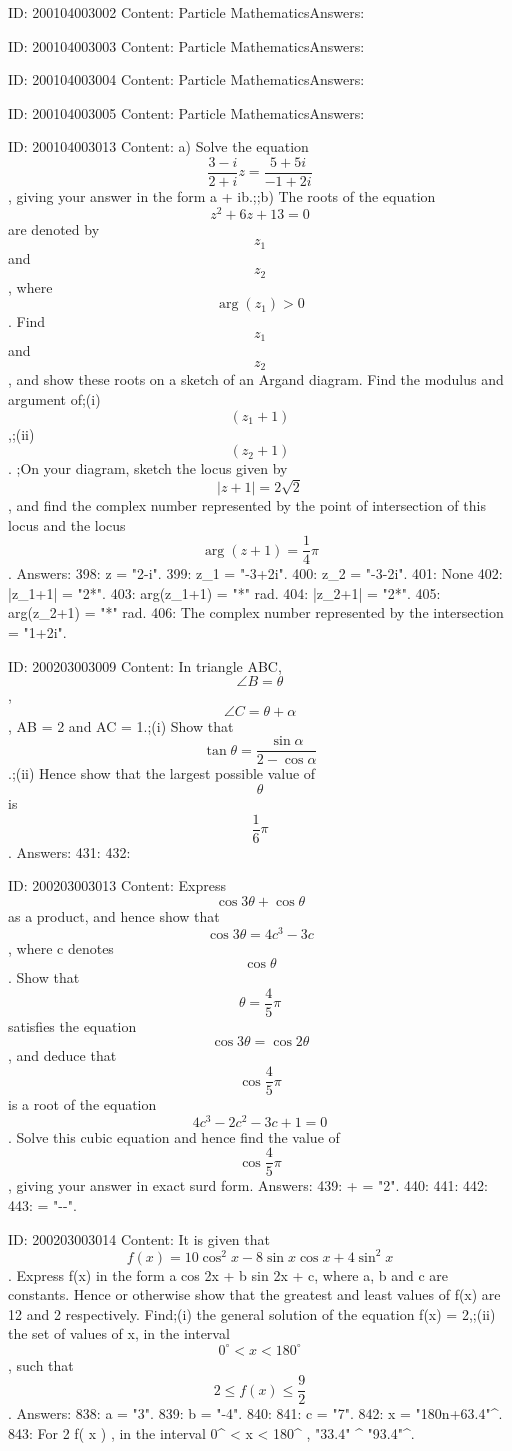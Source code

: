 \documentclass{article}
\begin{document}
ID: 200104003002
Content:
Particle MathematicsAnswers:

ID: 200104003003
Content:
Particle MathematicsAnswers:

ID: 200104003004
Content:
Particle MathematicsAnswers:

ID: 200104003005
Content:
Particle MathematicsAnswers:

ID: 200104003013
Content:
a)  Solve the equation  $$\frac{3 - i}{2 + i}z = \frac{5 + 5i}{- 1 + 2i}$$, giving your answer in the form a + ib.;;b) The roots of the equation  $$z^2  + 6z + 13 = 0$$ are denoted by  $$z_1 $$ and  $$z_2 $$, where  $$\arg ( z_1  ) > 0$$. Find  $$z_1 $$ and  $$z_2 $$, and show these roots on a sketch of an Argand diagram. Find the modulus and argument of;(i)  $$( z_1  + 1 )$$,;(ii)  $$( z_2  + 1 )$$. ;On your diagram, sketch the locus given by  $$| z + 1 | = 2\sqrt 2 $$, and find the complex number represented by the point of intersection of this locus and the locus  $$\arg ( z + 1 ) = \frac{1}{4}\pi $$. Answers:
398: z = "2-i".
399: z_1 = "-3+2i".
400: z_2 = "-3-2i".
401: None
402: |z_1+1| = "2*".
403: arg(z_1+1) = "*\pi" rad.
404: |z_2+1| = "2*".
405: arg(z_2+1) = "*\pi" rad.
406: The complex number represented by the intersection = "1+2i".

ID: 200203003009
Content:
In triangle ABC,  $$\angle B = \theta $$,  $$\angle C = \theta  + \alpha $$, AB = 2 and AC = 1.;(i) Show that  $$\tan \theta  = \frac{\sin \alpha}{2 - \cos \alpha}$$.;(ii) Hence show that the largest possible value of  $$\theta $$ is  $$\frac{1}{6}\pi $$. Answers:
431: 
432: 

ID: 200203003013
Content:
Express  $$\cos 3\theta  + \cos \theta $$ as a product, and hence show that  $$\cos 3\theta  = 4c^3  - 3c$$, where c denotes  $$\cos \theta $$. Show that  $$\theta  = \frac{4}{5}\pi $$ satisfies the equation  $$\cos 3\theta  = \cos 2\theta $$, and deduce that  $$\cos \frac{4}{5}\pi $$ is a root of the equation  $$4c^3  - 2c^2  - 3c + 1 = 0$$. Solve this cubic equation and hence find the value of  $$\cos \frac{4}{5}\pi$$, giving your answer in exact surd form. Answers:
439: \theta  + \cos \theta  = "2\cos{2\theta}\cos{\theta}".
440: 
441: 
442: 
443: \cos {}\pi = "--".

ID: 200203003014
Content:
It is given that  $$f( x ) = 10\cos ^2 x - 8\sin x\cos x + 4\sin ^2 x$$. Express f(x) in the form a cos 2x + b sin 2x + c, where a, b and c are constants. Hence or otherwise show that the greatest and least values of f(x) are 12 and 2 respectively. Find;(i) the general solution of the equation f(x) = 2,;(ii) the set of values of x, in the interval  $$0^{\circ}  < x < 180^{\circ} $$, such that  $$2 \le f( x ) \le \frac{9}{2}$$. Answers:
838: a = "3".
839: b = "-4".
840: 
841: c = "7".
842: x = "180n+63.4"^{\circ}.
843: For 2 \le f( x ) \le {}, in the interval 0^{\circ}  < x < 180^{\circ} , "33.4" ^{\circ} \leqx\leq"93.4"^{\circ}.
\end{document}
